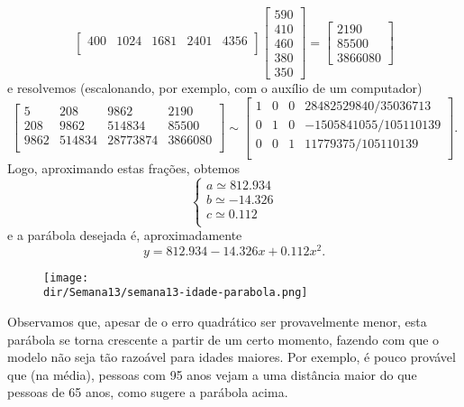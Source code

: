 \documentclass[../livro.tex]{subfiles}  %
\providecommand{\dir}{..}
\begin{document}
\begin{example}
\[\begin{bmatrix}
    400 & 1024 & 1681 & 2401 & 4356 \\
  \end{bmatrix}
  \begin{bmatrix}
    590 \\ 410 \\ 460 \\ 380 \\ 350
  \end{bmatrix} =
  \begin{bmatrix}
    2190 \\ 85500 \\ 3866080
  \end{bmatrix}
  \] e resolvemos (escalonando, por exemplo, com o auxílio de um computador)
  \[
  \begin{bmatrix}
    5 & 208 & 9862 & 2190 \\
    208 & 9862 & 514834 & 85500 \\
    9862 & 514834 & 28773874 & 3866080 \\
  \end{bmatrix} \sim
  \begin{bmatrix}
    1 & 0 & 0 & 28482529840/35036713 \\
    0 & 1 & 0 & -1505841055/105110139 \\
    0 & 0 & 1 & 11779375/105110139 \\
  \end{bmatrix}.
  \] Logo, aproximando estas frações, obtemos
  \[
  \left\{
    \begin{array}{ll}
      a \simeq 812.934 \\
      b \simeq -14.326 \\
      c \simeq  0.112 \\
    \end{array}
  \right.
  \] e a parábola desejada é, aproximadamente
  \[
  y = 812.934 - 14.326 x + 0.112 x^2.
  \]
  \begin{figure}[h!]
    \begin{center}
      \texttt{[image: \\dir/Semana13/semana13-idade-parabola.png]}
    \end{center}
  \end{figure}

  \noindent Observamos que, apesar de o erro quadrático ser provavelmente menor, esta parábola se torna crescente a partir de um certo momento, fazendo com que o modelo não seja tão razoável para idades maiores. Por exemplo, é pouco provável que (na média), pessoas com 95 anos vejam a uma distância maior do que pessoas de 65 anos, como sugere a parábola acima.
\end{example}
\end{document}
